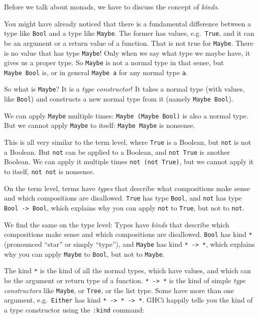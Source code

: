 \documentclass[11pt,
  american,
  DIV13]{article}
\begin{document}
Before we talk about monads, we have to discuss the concept of
\emph{kinds}.

You might have already noticed that there is a fundamental difference
between a type like \texttt{Bool} and a type like \texttt{Maybe}. The
former has values, e.g.~\texttt{True}, and it can be an argument or a
return value of a function. That is not true for \texttt{Maybe}. There
is no value that has type \texttt{Maybe}! Only when we say what type we
maybe have, it gives us a proper type. So \texttt{Maybe} is not a normal
type in that sense, but \texttt{Maybe\ Bool} is, or in general
\texttt{Maybe\ a} for any normal type \texttt{a}.

So what is \texttt{Maybe}? It is a \emph{type constructor}! It takes a
normal type (with values, like \texttt{Bool}) and constructs a new
normal type from it (namely \texttt{Maybe\ Bool}).

We can apply \texttt{Maybe} multiple times:
\texttt{Maybe\ (Maybe\ Bool)} is also a normal type. But we cannot apply
\texttt{Maybe} to itself: \texttt{Maybe\ Maybe} is nonsense.

This is all very similar to the term level, where \texttt{True} is a
Boolean, but \texttt{not} is not a Boolean. But \texttt{not} can be
applied to a Boolean, and \texttt{not\ True} is another Boolean. We can
apply it multiple times \texttt{not\ (not\ True)}, but we cannot apply
it to itself, \texttt{not\ not} is nonsense.

On the term level, terms have \emph{types} that describe what
compositions make sense and which compositions are disallowed.
\texttt{True} has type \texttt{Bool}, and \texttt{not} has type
\texttt{Bool\ -\textgreater{}\ Bool}, which explains why you can apply
\texttt{not} to \texttt{True}, but not to \texttt{not}.

We find the same on the type level: Types have \emph{kinds} that
describe which compositions make sense and which compositions are
disallowed. \texttt{Bool} has kind \texttt{*} (pronounced ``star'' or
simply ``type''), and \texttt{Maybe} has kind
\texttt{*\ -\textgreater{}\ *}, which explains why you can apply
\texttt{Maybe} to \texttt{Bool}, but not to \texttt{Maybe}.

The kind \texttt{*} is the kind of all the normal types, which have
values, and which can be the argument or return type of a function.
\texttt{*\ -\textgreater{}\ *} is the kind of simple \emph{type
constructors} like \texttt{Maybe}, or \texttt{Tree}, or the list type.
Some have more than one argument, e.g.~\texttt{Either} has kind
\texttt{*\ -\textgreater{}\ *\ -\textgreater{}\ *}. GHCi happily tells
you the kind of a type constructor using the \texttt{:kind} command:
\end{document}
